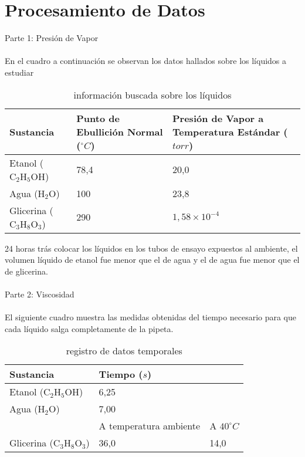 \documentclass{article}
\begin{document}
\pagebreak

\section{Procesamiento de Datos}

Parte 1: Presión de Vapor
\\
\\
En el cuadro a continuación se observan los datos hallados sobre los líquidos a estudiar

\begin{table}[H]
\centering
\begin{tabular}{|m{3.2cm}|m{3cm}|m{5cm}|}
\hline
\rowcolor[HTML]{C0C0C0} 
Sustancia & Punto de Ebullición Normal ($^\circ C$) & Presión de Vapor a Temperatura Estándar ($torr$) \\ \hline
Etanol ($\text{C}_{\text{2}}\text{H}_{\text{5}}\text{OH}$) & 78,4 & 20,0 \\ \hline
Agua ($\text{H}_{\text{2}}\text{O}$) & 100 & 23,8 \\ \hline
Glicerina ($\text{C}_{\text{3}}\text{H}_{\text{8}}\text{O}_{\text{3}}$) & 290 & $1,58\times10^{-4}$ \\ \hline
\end{tabular}
\caption{información buscada sobre los líquidos}
\label{datos}
\end{table}

24 horas trás colocar los líquidos en los tubos de ensayo expuestos al ambiente, el volumen líquido de etanol fue menor que el de agua y el de agua fue menor que el de glicerina.
\\
\\
Parte 2: Viscosidad
\\
\\
El siguiente cuadro muestra las medidas obtenidas del tiempo necesario para que cada líquido salga completamente de la pipeta.

\begin{table}[H]
\centering
\begin{tabular}{|m{3.4cm}|m{4cm}m{4cm}|}
\hline
\rowcolor[HTML]{C0C0C0} 
Sustancia & \multicolumn{2}{l|}{\cellcolor[HTML]{C0C0C0}Tiempo ($s$)} \\ \hline
Etanol ($\text{C}_{\text{2}}\text{H}_{\text{5}}\text{OH}$) & \multicolumn{2}{l|}{6,25} \\ \hline
Agua ($\text{H}_{\text{2}}\text{O}$) & \multicolumn{2}{l|}{7,00} \\ \hline
 & \multicolumn{1}{l|}{A temperatura ambiente} & A $40^\circ C$ \\ \cline{2-3} 
\multirow{-2}{*}{Glicerina ($\text{C}_{\text{3}}\text{H}_{\text{8}}\text{O}_{\text{3}}$)} & \multicolumn{1}{l|}{36,0} & 14,0 \\ \hline
\end{tabular}
\caption{registro de datos temporales}
\label{viscosidad}
\end{table}
\end{document}
